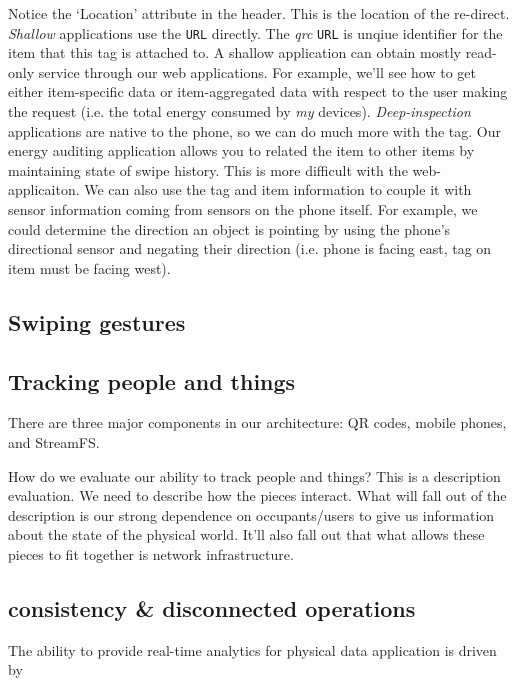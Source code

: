 Notice the `Location' attribute in the header.  This is the location of the re-direct.  \emph{Shallow} applications
use the {\tt URL} directly.  The \emph{qrc} {\tt URL} is unqiue identifier for the item that this tag is attached to.
A shallow application can obtain mostly read-only service through our web applications.  For example, we'll see how
to get either item-specific data or item-aggregated data with respect to the user making the request (i.e. the total
energy consumed by \emph{my} devices).  \emph{Deep-inspection} applications are native to the phone, so we can do much
more with the tag.  Our energy auditing application allows you to related the item to other items by maintaining state of swipe
history.  This is more difficult with the web-applicaiton.  We can also use the tag and item information to couple it with
sensor information coming from sensors on the phone itself.  For example, we could determine the direction an object
is pointing by using the phone's directional sensor and negating their direction (i.e. phone is facing east, tag on item must
be facing west).








\subsection{Swiping gestures}
\label{sec:swipes}

\subsection{Tracking people and things}
There are three major components in our architecture: QR codes, mobile phones, and StreamFS.

How do we evaluate our ability to track people and things?
This is a description evaluation.  We need to describe how the pieces interact.  What will fall out of the description is our strong dependence on occupants/users to give us information about the state of the physical world.  It’ll also fall out that what allows these pieces to fit together is network infrastructure.



\subsection{consistency \& disconnected operations}

The ability to provide real-time analytics for physical data application is driven by 


